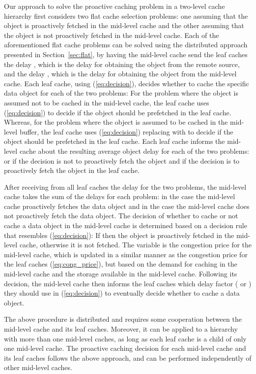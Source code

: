 \documentclass[conference]{IEEEtran}
\begin{document}
Our approach to solve the proactive caching problem  in a two-level cache hierarchy first considers two flat cache selection problems: one assuming that the object is proactively fetched in the mid-level cache and the other assuming that the object is not proactively fetched in the mid-level cache.
Each of the aforementioned flat cache problems can be solved using the distributed approach presented in Section~\ref{sec:flat},
by having the mid-level cache send the leaf caches  the delay  , which is the delay for obtaining the object from the remote source, and the delay , which is the delay for obtaining the object from the mid-level cache.
Each leaf cache, using (\ref{eq:decision}), decides whether to cache the specific data object for each of the two problems:
For the problem where the object is assumed not to be cached in the mid-level cache, the leaf cache uses (\ref{eq:decision}) to decide if the object should be prefetched in the leaf cache. Whereas, for the problem where the object is assumed to be cached in the mid-level buffer, the leaf cache uses (\ref{eq:decision}) replacing  with  to decide if the object should be prefetched in the leaf cache.
Each leaf cache informs the mid-level cache about the resulting average object delay for each of the two problems:  or  if the decision is not to proactively fetch the object  and  if the decision is to proactively fetch the object in the leaf cache.

After receiving from all leaf caches the  delay for the two problems, the mid-level cache takes the sum of the delays for each problem:  in the case the mid-level cache  proactively fetches the data object and  in the case the mid-level cache does not proactively fetch the data object. The decision of whether to cache or not cache a data object in the mid-level cache is determined based on a decision rule that resembles (\ref{eq:decision}):
If  then the object is proactively fetched in the mid-level cache, otherwise it is not fetched. The variable   is the congestion price for the mid-level cache, which is updated in a similar manner as the congestion price for the leaf caches (\ref{eq:cong_price}), but based on the demand for caching in the mid-level cache and the storage available in the mid-level cache.
Following its decision, the mid-level cache then informs the leaf caches which delay factor ( or ) they should use in (\ref{eq:decision}) to eventually decide whether to cache a data object.

The above procedure is distributed and requires some cooperation between the mid-level cache and its leaf caches.
Moreover, it can be applied to a hierarchy with more than one mid-level caches, as long as each leaf cache is a child of only one mid-level cache. The proactive caching decision for each mid-level cache and its leaf caches follows the above approach, and can be performed independently of other mid-level caches.
\end{document}
